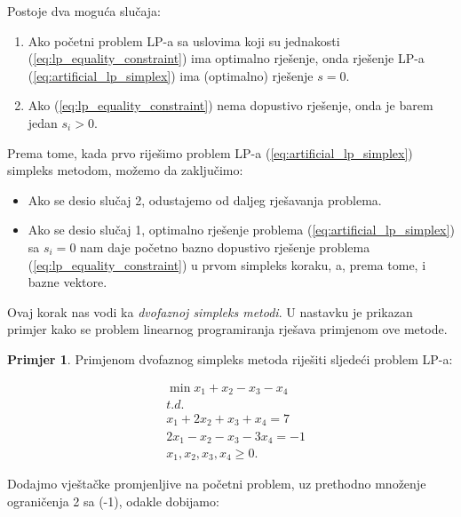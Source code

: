 \documentclass[a4paper, utf8, 11pt, colorlinks]{book}
\theoremstyle{definition}
\newtheorem{primjer}{Primjer}[chapter]
\begin{document}
Postoje dva moguća slučaja:
\begin{enumerate}
    \item Ako početni problem LP-a sa uslovima koji su jednakosti (\ref{eq:lp_equality_constraint}) 
          ima optimalno rješenje, onda   rješenje LP-a (\ref{eq:artificial_lp_simplex}) ima (optimalno) rješenje $s = 0$. 
    \item Ako  (\ref{eq:lp_equality_constraint}) nema dopustivo rješenje, onda je barem jedan $s_i > 0$.
\end{enumerate}
 Prema tome, kada  prvo riješimo  problem LP-a  (\ref{eq:artificial_lp_simplex}) simpleks metodom, možemo da zaključimo:
 \begin{itemize}
      \item Ako se desio slučaj 2, odustajemo od daljeg rješavanja problema.
      \item Ako se desio slučaj 1, optimalno rješenje problema (\ref{eq:artificial_lp_simplex}) sa $s_i=0$ nam daje početno bazno dopustivo rješenje problema (\ref{eq:lp_equality_constraint}) u prvom simpleks koraku, a, prema tome, i bazne vektore. 
 \end{itemize} 
 Ovaj korak nas vodi ka \emph{dvofaznoj simpleks metodi}. U nastavku je prikazan primjer kako se problem linearnog programiranja rješava primjenom ove metode.      
      
  
 
\begin{primjer} Primjenom dvofaznog simpleks metoda riješiti sljedeći problem LP-a:
	\end{primjer} 

\begin{align*}
	 &\min x_1 + x_2 - x_3 - x_4 \\
	 & {t.d.} \\
	 &x_1 + 2x_2 + x_3 + x_4 = 7 \\
	 & 2x_1 - x_2 - x_3 - 3x_4 = -1 \\
	 & x_1,x_2,x_3,x_4 \geq 0.
\end{align*}

Dodajmo vještačke promjenljive na početni problem, uz prethodno množenje ograničenja 2 sa (-1), odakle dobijamo:
\end{document}
